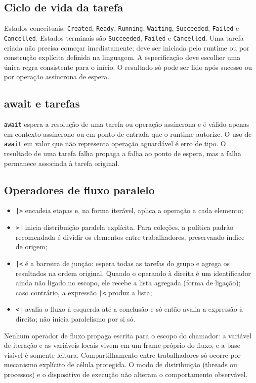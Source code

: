 \documentclass[12pt,a4paper]{article}
\begin{document}
\subsection{Ciclo de vida da tarefa}
Estados conceituais: \texttt{Created}, \texttt{Ready}, \texttt{Running}, \texttt{Waiting}, \texttt{Succeeded}, \texttt{Failed} e \texttt{Cancelled}. Estados terminais são \texttt{Succeeded}, \texttt{Failed} e \texttt{Cancelled}. Uma tarefa criada não precisa começar imediatamente; deve ser iniciada pelo runtime ou por construção explícita definida na linguagem. A especificação deve escolher uma única regra consistente para o início. O resultado só pode ser lido após sucesso ou por operação assíncrona de espera.
\subsection{await e tarefas}
\texttt{await} espera a resolução de uma tarefa ou operação assíncrona e é válido apenas em contexto assíncrono ou em ponto de entrada que o runtime autorize. O uso de \texttt{await} em valor que não representa operação aguardável é erro de tipo. O resultado de uma tarefa falha propaga a falha ao ponto de espera, mas a falha permanece associada à tarefa original.
\subsection{Operadores de fluxo paralelo}
\begin{itemize}
\item \texttt{|>} encadeia etapas e, na forma iterável, aplica a operação a cada elemento;
\item \texttt{>|} inicia distribuição paralela explícita. Para coleções, a política padrão recomendada é dividir os elementos entre trabalhadores, preservando índice de origem;
\item \texttt{|<} é a barreira de junção: espera todas as tarefas do grupo e agrega os resultados na ordem original. Quando o operando à direita é um identificador ainda não ligado no escopo, ele recebe a lista agregada (forma de ligação); caso contrário, a expressão \texttt{|<} produz a lista;
\item \texttt{<|} avalia o fluxo à esquerda até a conclusão e só então avalia a expressão à direita; não inicia paralelismo por si só.
\end{itemize}
Nenhum operador de fluxo propaga escrita para o escopo do chamador: a variável de iteração e as variáveis locais vivem em um frame próprio do fluxo, e a base visível é somente leitura. Compartilhamento entre trabalhadores só ocorre por mecanismo explícito de célula protegida. O modo de distribuição (threads ou processos) e o dispositivo de execução não alteram o comportamento observável.
\end{document}

